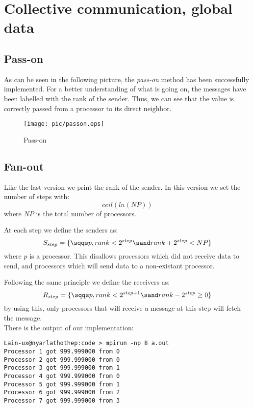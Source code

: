 \chapter{Collective communication, global data}

\section{Pass-on}

As can be seen in the following picture, the \textit{pass-on} method has been successfully implemented. For a better understanding of what is going on, the messages have been labelled with the rank of the sender. Thus, we can see that the value is correctly passed from a processor to its direct neighbor.
\begin{figure}[!h]
\begin{center}
	\texttt{[image: pic/passon.eps]}
	\caption{Pass-on}
\end{center}
\end{figure}

\section{Fan-out}

Like the last version we print the rank of the sender. In this version we set the number of steps with:
$$ceil(ln(NP))$$
where $NP$ is the total number of processors.

At each step we define the senders as:
$$S_{step}=\{\sqqs p, rank < 2^{step} \sand rank + 2^{step} < NP\}$$
where $p$ is a processor. This disallows processors which did not receive data to send, and processors which will send data to a non-existant processor.

Following the same principle we define the receivers as:
$$R_{step}=\{\sqqs p, rank < 2^{step+1} \sand rank - 2^{step} \ge 0\}$$
by using this, only processors that will receive a message at this step will fetch the message.\\

There is the output of our implementation:

\begin{verbatim}
Lain-ux@nyarlathothep:code > mpirun -np 8 a.out 
Processor 1 got 999.999000 from 0
Processor 2 got 999.999000 from 0
Processor 3 got 999.999000 from 1
Processor 4 got 999.999000 from 0
Processor 5 got 999.999000 from 1
Processor 6 got 999.999000 from 2
Processor 7 got 999.999000 from 3
\end{verbatim}

